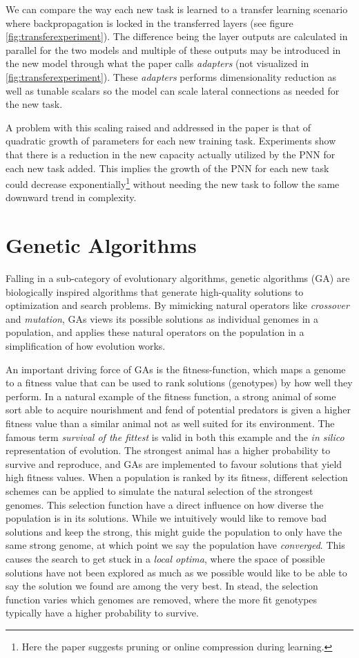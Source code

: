 We can compare the way each new task is learned to a transfer learning scenario where backpropagation is locked in the transferred layers (see figure \ref{fig:transferexperiment}). The difference being the layer outputs are calculated in parallel for the two models and multiple of these outputs may be introduced in the new model through what the paper calls \textit{adapters} (not visualized in \ref{fig:transferexperiment}). These \textit{adapters} performs dimensionality reduction as well as tunable scalars so the model can scale lateral connections as needed for the new task.

A problem with this scaling raised and addressed in the paper is that of quadratic growth of parameters for each new training task. Experiments show that there is a reduction in the new capacity actually utilized by the PNN for each new task added. This implies the growth of the PNN for each new task could decrease exponentially\footnote{Here the paper suggests pruning or online compression during learning.} without needing the new task to follow the same downward trend in complexity. 

\section{Genetic Algorithms}
Falling in a sub-category of evolutionary algorithms, genetic algorithms (GA) are biologically inspired algorithms that generate high-quality solutions to optimization and search problems. By mimicking natural operators like \textit{crossover} and \textit{mutation}, GAs views its possible solutions as individual genomes in a population, and applies these natural operators on the population in a simplification of how evolution works. 

An important driving force of GAs is the fitness-function, which maps a genome to a fitness value that can be used to rank solutions (genotypes) by how well they perform. In a natural example of the fitness function, a strong animal of some sort able to acquire nourishment and fend of potential predators is given a higher fitness value than a similar animal not as well suited for its environment. The famous term \textit{survival of the fittest} is valid in both this example and the \textit{in silico} representation of evolution. The strongest animal has a higher probability to survive and reproduce, and GAs are implemented to favour solutions that yield high fitness values.  
When a population is ranked by its fitness, different selection schemes can be applied to simulate the natural selection of the strongest genomes. This selection function have a direct influence on how diverse the population is in its solutions. While we intuitively would like to remove bad solutions and keep the strong, this might guide the population to only have the same strong genome, at which point we say the population have \textit{converged}. This causes the search to get stuck in a \textit{local optima}, where the space of possible solutions have not been explored as much as we possible would like to be able to say the solution we found are among the very best. In stead, the selection function varies which genomes are removed, where the more fit genotypes typically have a higher probability to survive. 


